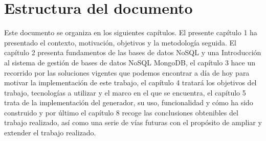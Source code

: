 \section{Estructura del documento}

Este documento se organiza en los siguientes capítulos. El presente capítulo 1 ha
presentado el contexto, motivación, objetivos y la metodología seguida. El capítulo 2 presenta fundamentos de las bases de datos NoSQL y una Introducción al sistema de gestión de bases de datos NoSQL MongoDB, el capítulo 3 hace un recorrido por las soluciones vigentes que podemos encontrar a día de hoy para motivar la implementación de este trabajo, el capítulo 4 tratará los objetivos del trabajo, tecnologías a utilizar y el marco en el que se encuentra, el capítulo 5 trata de la implementación del generador, su uso, funcionalidad y cómo ha sido construido y por último el capítulo 8 recoge las conclusiones obtenibles del trabajo realizado, así como una serie de vías futuras con el propósito de ampliar y extender el trabajo realizado.

